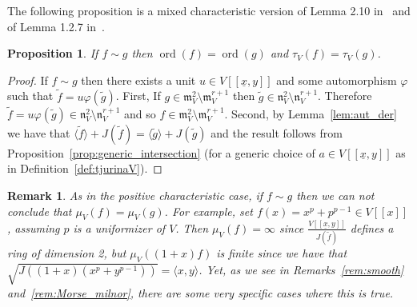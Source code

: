 \documentclass{article}
\newtheorem{proposition}[theorem]{Proposition}
\newtheorem{remark}[theorem]{Remark}
\DeclareMathOperator{\ord}{ord}
\newcommand{\maxV}{\mathfrak{m}_V}
\newcommand{\naxV}{\mathfrak{n}_V}
\newcommand{\Vxy}{V[[\underline{x},y]]}
\numberwithin{theorem}{section}
\begin{document}


The following proposition is a mixed characteristic version of Lemma 2.10 in~\cite{greuel2007introduction} and of Lemma 1.2.7 in~\cite{boubakri2009hypersurface}.

\begin{proposition}\label{prop:order_equivalence}
    If $f \sim g$ then $\ord\left(f\right)=\ord\left(g\right)$ and $\tau_V\left(f\right) = \tau_V\left(g\right)$.

    
\end{proposition}

\begin{proof}
         If $f \sim g$ then there exists a unit $u \in \Vxy$ and some automorphism $\varphi$ such that $\tilde{f}=u \varphi(\tilde{g})$. First, If $g \in \maxV^2 \setminus \maxV^{r+1}$ then $\tilde{g} \in \naxV^2 \setminus \naxV^{r+1}$. Therefore $\tilde{f}=u \varphi(\tilde{g}) \in \naxV^2 \setminus \naxV^{r+1}$ and so $f \in \maxV^2 \setminus \maxV^{r+1}$. Second, by Lemma~\ref{lem:aut_der} we have that $\langle \tilde{f}\rangle +J(\tilde{f})=\langle \tilde{g}\rangle+J\left(\tilde{g}\right)$ and the result follows from Proposition~\ref{prop:generic_intersection} (for a generic choice of $a \in \Vxy$ as in Definition~\ref{def:tjurinaV}). 
\end{proof}

\begin{remark}\label{rem:equiv_non_iso}
\textup{As in the positive characteristic case, if $f \sim g$ then we can not conclude that $\mu_V\left(f\right)=\mu_V\left(g\right)$. For example, set $f\left(x\right)=x^p + p^{p-1} \in V[[x]]$, assuming $p$ is a uniformizer of $V$. Then $\mu_V\left(f\right) = \infty$ since $\frac{\Vxy}{J(\tilde{f})}$ defines a ring of dimension 2, but $\mu_V\left(\left(1+x\right)f\right)$ is finite since we have that $\sqrt{J\left(\left(1+x\right)\left(x^p + y^{p-1}\right)\right)}=\langle x,y \rangle$.  Yet, as we see in Remarks~\ref{rem:smooth} and~\ref{rem:Morse_milnor}, there are some very specific cases where this is true. }
\end{remark}
\end{document}
